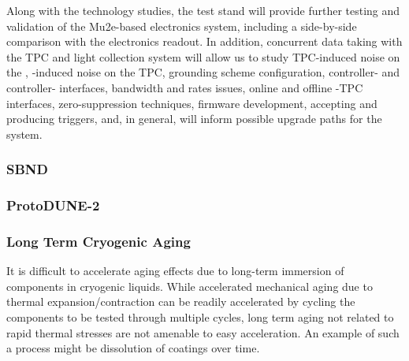 Along with the  technology studies, the test stand will  provide further testing and validation of the  Mu2e-based electronics system, including a side-by-side comparison with the   electronics readout. In addition, concurrent data taking with the TPC and light collection system will allow us to study TPC-induced noise on the , -induced noise on the TPC, grounding scheme configuration, controller- and controller- interfaces, bandwidth and rates issues, online and offline -TPC interfaces, zero-suppression techniques, firmware development, accepting and producing triggers, and, in general, will inform possible upgrade paths for the system. 



\subsubsection{SBND}
\label{sec:valid-sbnd}


\subsubsection{ProtoDUNE-2}
\label{sec:valid-pdune2}



\subsubsection{Long Term Cryogenic Aging}
\label{sec:valid-longtermaging}


It is difficult to accelerate aging effects due to long-term immersion of components in cryogenic liquids.  While accelerated mechanical aging due to thermal expansion/contraction can be readily accelerated by cycling the components to be tested through multiple cycles, long term aging not related to rapid thermal stresses are not amenable to easy acceleration.  An example of such a process might be dissolution of  coatings over time.

